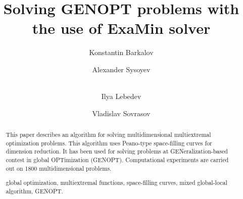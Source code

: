 \documentclass{llncs}
\begin{document}
\mainmatter 

\title{Solving GENOPT problems \newline with the use of ExaMin solver}
\author{Konstantin Barkalov \Letter \and Alexander Sysoyev \and \\ Ilya Lebedev \and Vladislav Sovrasov \\
}









\maketitle

\begin{abstract}

This paper describes an algorithm for solving multidimensional multiextremal optimization problems. This algorithm uses Peano-type space-filling curves for dimension reduction. It has been used for solving problems at GENeralization-based
contest in global OPTimization (GENOPT). Computational experiments are carried out on 1800 multidimensional problems.

\keywords global optimization, multiextremal functions, space-filling curves, mixed global-local algorithm, GENOPT.

\end{abstract}
\end{document}
